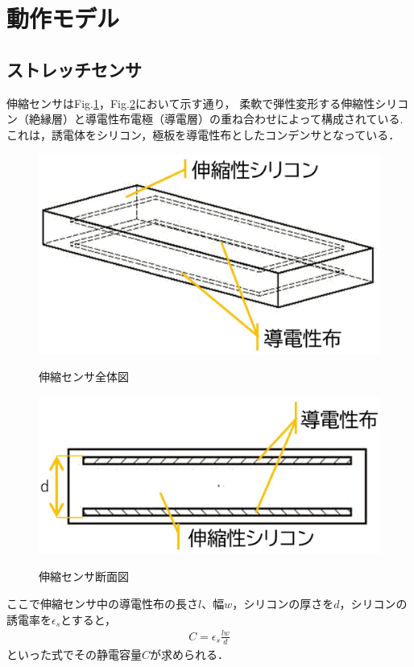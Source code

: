 \section{動作モデル}
\subsection{ストレッチセンサ}
伸縮センサはFig.\ref{伸縮センサ全体図}，Fig.\ref{伸縮センサ断面図}において示す通り，
柔軟で弾性変形する伸縮性シリコン（絶縁層）と導電性布電極（導電層）の重ね合わせによって構成されている.
これは，誘電体をシリコン，極板を導電性布としたコンデンサとなっている．

\begin{figure}[h]
    \begin{center}
        \label{伸縮センサ全体図}
        \includegraphics[width=0.5\columnwidth,clip]{./2_measurement/slide1.eps}
        \caption{伸縮センサ全体図}
    \end{center}
\end{figure}
\begin{figure}[h]
    \begin{center}       
        \label{伸縮センサ断面図}
        \includegraphics[width=0.5\columnwidth,clip]{./2_measurement/slide2.eps}
        \caption{伸縮センサ断面図}
    \end{center}
\end{figure}

ここで伸縮センサ中の導電性布の長さ$l$、幅$w$，シリコンの厚さを$d$，シリコンの誘電率を$\epsilon{}_s$とすると，
\begin{eqnarray}
    C=\epsilon{}_s\frac{lw}{d}
    \label{cap}
\end{eqnarray}
といった式でその静電容量$C$が求められる．

